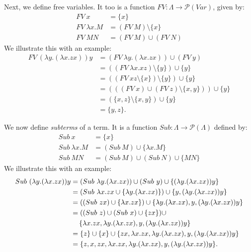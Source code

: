 \documentclass[a4paper, openany]{memoir}
\theoremstyle{definition}
\begin{document}
    Next, we define free variables. It too is a function $FV \colon \Lambda \to \mathcal{P}(\textit{Var})$, given by:
    \begin{align*}
        FV \ x &= \{x\} \\
        FV \ \lambda x. M &= (FV \ M) \setminus \{x\} \\
        FV \ MN &= (FV \ M) \cup (FV \ N)
    \end{align*}
    We illustrate this with an example:
    \begin{align*}
        FV \ (\lambda y. (\lambda x. zx)) y &= (FV \ \lambda y.(\lambda x. zx)) \cup (FV \ y) \\
        &= ((FV \ \lambda x.xz) \setminus \{y\}) \cup \{y\} \\
        &= ((FV \ xz \setminus \{x\}) \setminus \{y\}) \cup \{y\} \\
        &= (((FV \ x) \cup (FV \ z) \setminus \{x, y\})) \cup \{y\} \\
        &= (\{x, z\} \setminus \{x, y\}) \cup \{y\} \\
        &= \{y, z\}.
    \end{align*}

    We now define \emph{subterms} of a term. It is a function $Sub \colon \Lambda \to \mathcal{P}(\Lambda)$ defined by:
    \begin{align*}
        Sub \ x &= \{x\} \\
        Sub \ \lambda x. M &= (Sub \ M) \cup \{\lambda x. M\} \\
        Sub \ MN &= (Sub \ M) \cup (Sub \ N) \cup \{MN\}
    \end{align*}
    We illustrate this with an example:
    \begin{align*}
        Sub \ (\lambda y. (\lambda x. zx)) y &= (Sub \ \lambda y. (\lambda x. zx)) \cup (Sub \ y) \cup \{(\lambda y. (\lambda x. zx)) y\} \\
        &= (Sub \ \lambda x. zx \cup \{\lambda y. (\lambda x. zx)\}) \cup \{y, (\lambda y. (\lambda x. zx)) y\} \\
        &= ((Sub \ zx) \cup \{\lambda x. zx\}) \cup \{\lambda y. (\lambda x. zx), y, (\lambda y. (\lambda x. zx)) y\} \\
        &= ((Sub \ z) \cup (Sub \ x) \cup \{zx\}) \cup \\
        &\hspace*{12pt} \{\lambda x. zx, \lambda y. (\lambda x. zx), y, (\lambda y. (\lambda x. zx)) y\} \\
        &= \{z\} \cup \{x\} \cup \{zx, \lambda x. zx, \lambda y. (\lambda x. zx), y, (\lambda y. (\lambda x. zx)) y\}  \\
        &= \{z, x, zx, \lambda x. zx, \lambda y. (\lambda x. zx), y, (\lambda y. (\lambda x. zx)) y\}.
    \end{align*}
\end{document}
